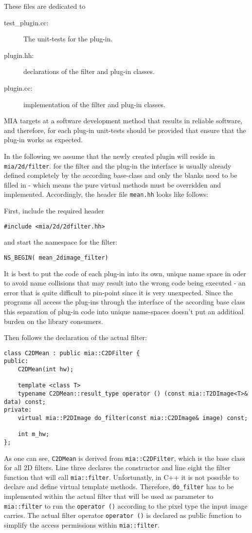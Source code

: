 \documentclass[english, 10pt, a4paper,headsepline,openany]{scrbook}
\begin{document}
These files are dedicated to 
\begin{description}
\item [test\_plugin.cc:] The unit-tests for the plug-in. 
\item [plugin.hh:] declarations of the filter and plug-in classes. 
\item [plugin.cc:] implementation of the filter and plug-in classes. 
\end{description}

MIA targets at a software development method that results in reliable software, and therefore,  
 for each plug-in unit-tests should be provided that ensure that the plug-in works as expected. 

In the following we assume that the newly created plugin will reside in \texttt{mia/2d/filter}. 
for the filter and the plug-in the interface is usually already defined completely by the according base-class
 and only the blanks need to be filled in - which means the pure virtual methods must be 
  overridden and implemented.
Accordingly, the header file \texttt{mean.hh} looks like follows: 

First, include the required header
\lstset{numbers=left,firstnumber=auto}
\begin{lstlisting}[MeanFilterHeader]
#include <mia/2d/2dfilter.hh>
\end{lstlisting}
and start the namespace for the filter: 
\begin{lstlisting}[MeanFilterHeader]
NS_BEGIN( mean_2dimage_filter)
\end{lstlisting}
It is best to put the code of each plug-in into its own, unique name space in oder to avoid 
  name collisions that may result into the wrong code being executed - an error that is quite 
  difficult to pin-point since it is very unexpected. 
Since the programs all access the plug-ins through the interface of the according base class this 
  separation of plug-in code into unique name-spaces doesn't put an additioal burden on the library consumers. 


Then follows the declaration of the actual filter: 
\begin{lstlisting}[MeanFilterHeader]
class C2DMean : public mia::C2DFilter {
public:
	C2DMean(int hw);

	template <class T>
	typename C2DMean::result_type operator () (const mia::T2DImage<T>& data) const;
private:
	virtual mia::P2DImage do_filter(const mia::C2DImage& image) const;

	int m_hw;
};
\end{lstlisting}
As one can see, \texttt{C2DMean} is derived from \texttt{mia::C2DFilter}, which is the base class 
  for all 2D filters.  
Line three declares the constructor and line eight the filter function that will call 
  \texttt{mia::filter}.
Unfortunatly, in C++ it is not possible to declare and define virtual template methods. 
Therefore, \texttt{do_filter} has to be implemented within the actual filter that will 
  be used as parameter to \texttt{mia::filter} to run the \texttt{operator ()} according 
  to the pixel type the input image carries. 
The actual filter operator \texttt{operator ()} is declared as public function to simplify 
  the access permissions within \texttt{mia::filter}. 
\end{document}
